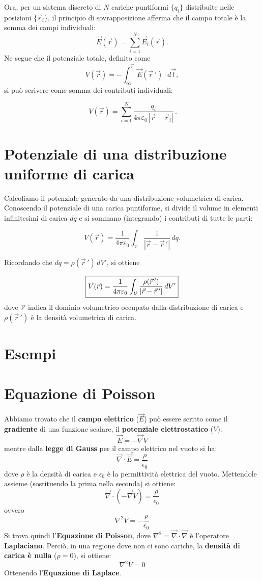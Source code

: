 \documentclass{book}
\begin{document}
Ora, per un sistema discreto di \(N\) cariche puntiformi \(\{q_i\}\) distribuite nelle posizioni \(\{\vec r_i\}\), il principio di sovrapposizione afferma che il campo totale è la somma dei campi individuali:
\[
\vec{E}(\vec r)=\sum_{i=1}^N \vec{E}_i(\vec r).
\]
Ne segue che il potenziale totale, definito come
\[
V(\vec r) = -\int_{\infty}^{\vec r} \vec{E}(\vec r\,')\cdot d\vec l,
\]
si può scrivere come somma dei contributi individuali:

\[
\boxed{\,V(\vec r)=\sum_{i=1}^{N}\dfrac{q_i}{4\pi\varepsilon_0\,|\vec r-\vec r_i|}\, .}
\]

\section{Potenziale di una distribuzione uniforme di carica}

Calcoliamo il potenziale generato da una distribuzione volumetrica di carica. Conoscendo il potenziale di una carica puntiforme, si divide il volume in elementi infinitesimi di carica \(dq\) e si sommano (integrando) i contributi di tutte le parti:

\[
V(\vec{r}) = \frac{1}{4\pi\varepsilon_0}\int_{\mathcal{V}}\frac{1}{|\vec{r}-\vec{r}\,'|}\,dq.
\]

Ricordando che \(dq=\rho(\vec{r}\,')\,dV'\), si ottiene

\[
\boxed{%
V(\vec{r}) = \frac{1}{4\pi\varepsilon_0}\int_{\mathcal{V}}\frac{\rho(\vec{r}\,')}{|\vec{r}-\vec{r}\,'|}\,dV'
}
\]
dove \(\mathcal{V}\) indica il dominio volumetrico occupato dalla distribuzione di carica e \(\rho(\vec r\,')\) è la densità volumetrica di carica.


\section{Esempi}
\section{Equazione di Poisson}

Abbiamo trovato che il \textbf{campo elettrico} ($\vec{E}$) può essere scritto come il \textbf{gradiente} di una funzione scalare, il \textbf{potenziale elettrostatico} ($V$):
$$
\vec{E} = - \vec{\nabla} V
$$
mentre dalla \textbf{legge di Gauss} per il campo elettrico nel vuoto si ha:
$$
\vec{\nabla} \cdot \vec{E} = \frac{\rho}{\epsilon_0}
$$
dove $\rho$ è la densità di carica e $\epsilon_0$ è la permittività elettrica del vuoto.
Mettendole assieme (sostituendo la prima nella seconda) si ottiene:
$$
\vec{\nabla} \cdot (-\vec{\nabla} V) = \frac{\rho}{\epsilon_0}
$$
ovvero
$$
\nabla^2 V = - \frac{\rho}{\epsilon_0}
$$
Si trova quindi l'\textbf{Equazione di Poisson}, dove $\nabla^2 = \vec{\nabla} \cdot \vec{\nabla}$ è l'operatore \textbf{Laplaciano}.
Perciò, in una regione dove non ci sono cariche, la \textbf{densità di carica è nulla} ($\rho=0$), si ottiene:
$$
\nabla^2 V = 0
$$
Ottenendo l'\textbf{Equazione di Laplace}.
\end{document}
